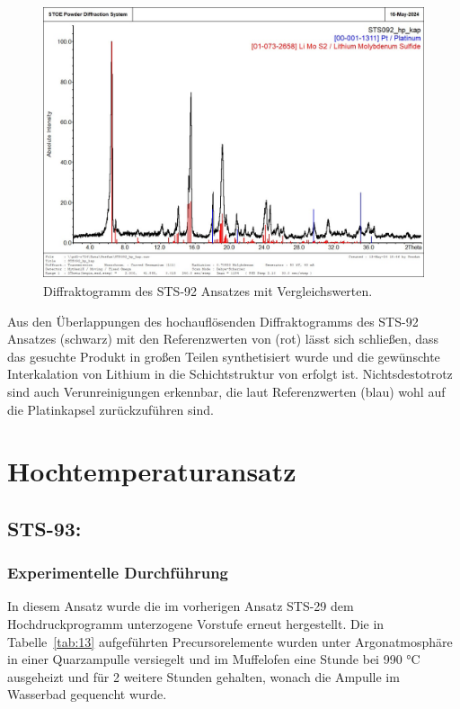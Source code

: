 \documentclass[12pt]{article}
\begin{document}
\begin{figure}[H]
    \centering
    \includegraphics[height=8cm]{Images/STS_092.jpg}
    \caption{Diffraktogramm des STS-92 Ansatzes mit Vergleichswerten.}
    \label{fig:9}
\end{figure}

\noindent Aus den Überlappungen des hochauflösenden Diffraktogramms des STS-92 Ansatzes (schwarz) mit den Referenzwerten von  (rot) lässt sich schließen, dass das gesuchte Produkt in großen Teilen synthetisiert wurde und die gewünschte Interkalation von Lithium in die Schichtstruktur von  erfolgt ist.
Nichtsdestotrotz sind auch Verunreinigungen erkennbar, die laut Referenzwerten (blau) wohl auf die Platinkapsel zurückzuführen sind.

\section{Hochtemperaturansatz}
\subsection{STS-93: }
\subsubsection{Experimentelle Durchführung}
In diesem Ansatz wurde die im vorherigen Ansatz STS-29 dem Hochdruckprogramm unterzogene Vorstufe erneut hergestellt.
Die in Tabelle~\ref{tab:13} aufgeführten Precursorelemente wurden unter Argonatmosphäre in einer Quarzampulle versiegelt und im Muffelofen eine Stunde bei 990 \si{\degreeCelsius} ausgeheizt und für 2 weitere Stunden gehalten, wonach die Ampulle im Wasserbad gequencht wurde.
\end{document}
